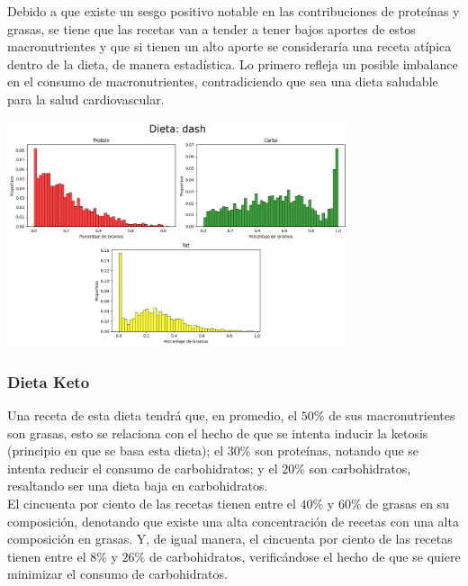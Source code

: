 \documentclass[12pt,a4paper]{article}
\begin{document}
        Debido a que existe un sesgo positivo notable en las contribuciones de 
        proteínas y grasas, se tiene que las recetas van a tender a tener bajos 
        aportes de estos macronutrientes y que si tienen un alto aporte se 
        consideraría una receta atípica dentro de la dieta, de manera estadística. 
        Lo primero refleja un posible imbalance en el consumo de macronutrientes, 
        contradiciendo que sea una dieta saludable para la salud cardiovascular.
        \begin{center}
            \includegraphics[width=0.75\textwidth]{Resources/2_03_plot_01.png}
        \end{center}

    \subsubsection{Dieta Keto}
        Una receta de esta dieta tendrá que, en promedio, el $50\%$ de 
        sus macronutrientes son grasas, esto se relaciona con el hecho de 
        que se intenta inducir la ketosis (principio en que se basa esta         
        dieta); el $30\%$ son proteínas, notando que se intenta reducir 
        el consumo de carbohidratos; y el $20\%$ son carbohidratos, 
        resaltando ser una dieta baja en carbohidratos.\\

        El cincuenta por ciento de las recetas tienen entre el $40\%$ y 
        $60\%$ de grasas en su composición, denotando que existe una alta 
        concentración de recetas con una alta composición en grasas. Y, de 
        igual manera, el cincuenta por ciento de las recetas tienen entre 
        el $8\%$ y $26\%$ de carbohidratos, verificándose el hecho de que 
        se quiere minimizar el consumo de carbohidratos.\\
\end{document}
